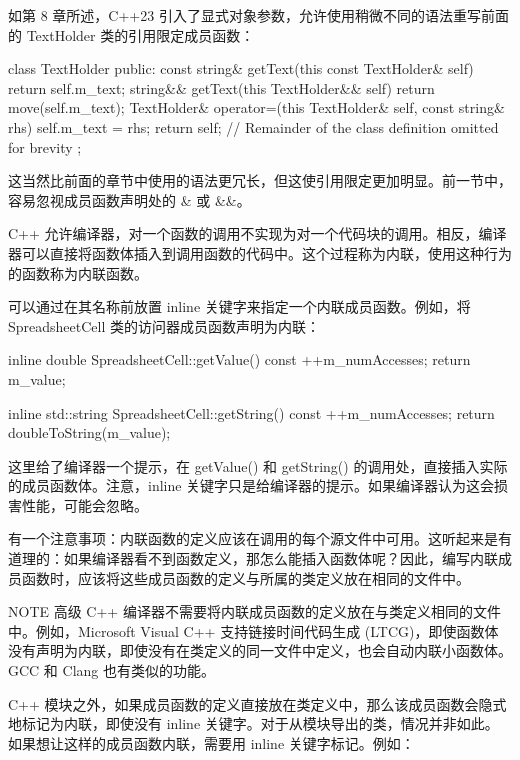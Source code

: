 如第 8 章所述，C++23 引入了显式对象参数，允许使用稍微不同的语法重写前面的 TextHolder 类的引用限定成员函数：

\begin{cpp}
class TextHolder
{
    public:
        const string& getText(this const TextHolder& self) { return self.m_text; }
        string&& getText(this TextHolder&& self) { return move(self.m_text); }
        TextHolder& operator=(this TextHolder& self, const string& rhs)
        {
            self.m_text = rhs;
            return self;
        }
    // Remainder of the class definition omitted for brevity
};
\end{cpp}

这当然比前面的章节中使用的语法更冗长，但这使引用限定更加明显。前一节中，容易忽视成员函数声明处的 \& 或 \&\&。


C++ 允许编译器，对一个函数的调用不实现为对一个代码块的调用。相反，编译器可以直接将函数体插入到调用函数的代码中。这个过程称为内联，使用这种行为的函数称为内联函数。

可以通过在其名称前放置 inline 关键字来指定一个内联成员函数。例如，将 SpreadsheetCell 类的访问器成员函数声明为内联：

\begin{cpp}
inline double SpreadsheetCell::getValue() const
{
    ++m_numAccesses;
    return m_value;
}

inline std::string SpreadsheetCell::getString() const
{
    ++m_numAccesses;
    return doubleToString(m_value);
}
\end{cpp}

这里给了编译器一个提示，在 getValue() 和 getString() 的调用处，直接插入实际的成员函数体。注意，inline 关键字只是给编译器的提示。如果编译器认为这会损害性能，可能会忽略。

有一个注意事项：内联函数的定义应该在调用的每个源文件中可用。这听起来是有道理的：如果编译器看不到函数定义，那怎么能插入函数体呢？因此，编写内联成员函数时，应该将这些成员函数的定义与所属的类定义放在相同的文件中。

\begin{myNotic}{NOTE}
高级 C++ 编译器不需要将内联成员函数的定义放在与类定义相同的文件中。例如，Microsoft Visual C++ 支持链接时间代码生成 (LTCG)，即使函数体没有声明为内联，即使没有在类定义的同一文件中定义，也会自动内联小函数体。GCC 和 Clang 也有类似的功能。
\end{myNotic}

C++ 模块之外，如果成员函数的定义直接放在类定义中，那么该成员函数会隐式地标记为内联，即使没有 inline 关键字。对于从模块导出的类，情况并非如此。如果想让这样的成员函数内联，需要用 inline 关键字标记。例如：

